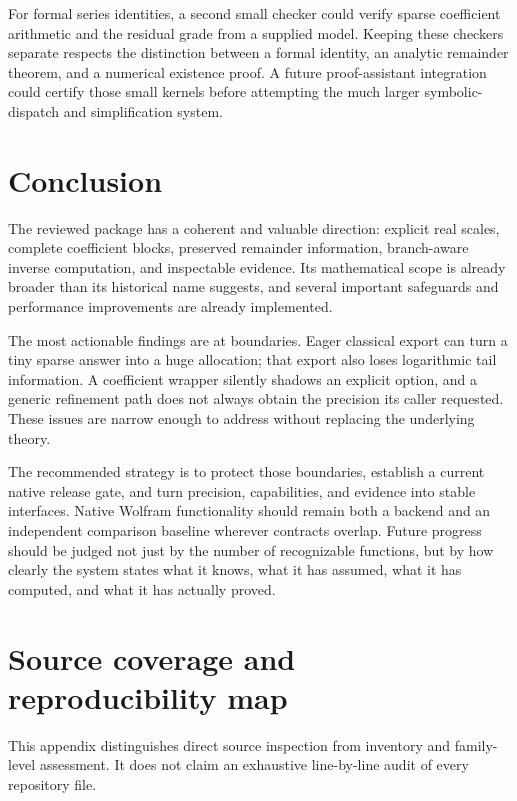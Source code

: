 \documentclass[11pt,a4paper]{article}
\begin{document}
For formal series identities, a second small checker could verify sparse
coefficient arithmetic and the residual grade from a supplied model.
Keeping these checkers separate respects the distinction between a formal
identity, an analytic remainder theorem, and a numerical existence proof.
A future proof-assistant integration could certify those small kernels
before attempting the much larger symbolic-dispatch and simplification
system.

\section{Conclusion}
The reviewed package has a coherent and valuable direction: explicit real
scales, complete coefficient blocks, preserved remainder information,
branch-aware inverse computation, and inspectable evidence. Its mathematical
scope is already broader than its historical name suggests, and several
important safeguards and performance improvements are already implemented.

The most actionable findings are at boundaries. Eager classical export can
turn a tiny sparse answer into a huge allocation; that export also loses
logarithmic tail information. A coefficient wrapper silently shadows an
explicit option, and a generic refinement path does not always obtain the
precision its caller requested. These issues are narrow enough to address
without replacing the underlying theory.

The recommended strategy is to protect those boundaries, establish a
current native release gate, and turn precision, capabilities, and evidence
into stable interfaces. Native Wolfram functionality should remain both a
backend and an independent comparison baseline wherever contracts overlap.
Future progress should be judged not just by the number of recognizable
functions, but by how clearly the system states what it knows, what it has
assumed, what it has computed, and what it has actually proved.

\appendix
\section{Source coverage and reproducibility map}
\label{sec:coverage}
This appendix distinguishes direct source inspection from inventory and
family-level assessment. It does not claim an exhaustive line-by-line audit
of every repository file.
\end{document}
